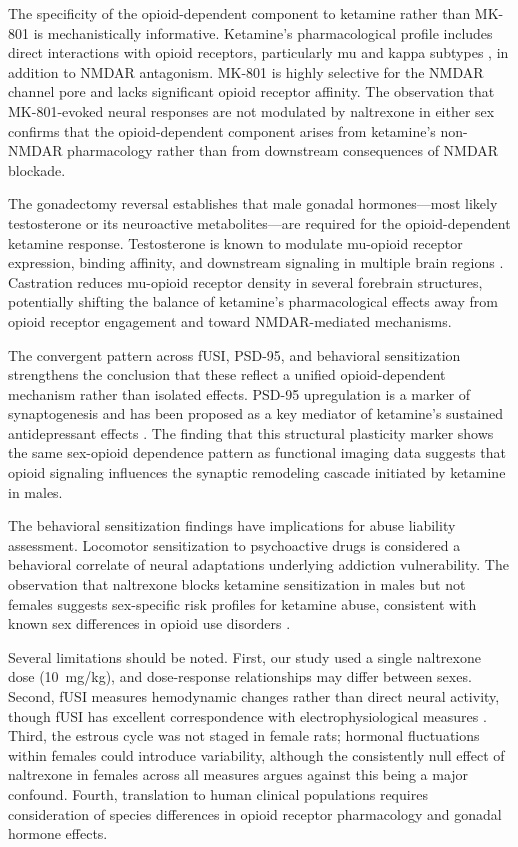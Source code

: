 \documentclass[11pt]{article}
\begin{document}
The specificity of the opioid-dependent component to ketamine rather than MK-801 is mechanistically informative. Ketamine's pharmacological profile includes direct interactions with opioid receptors, particularly mu and kappa subtypes \citep{rabiner2020imaging}, in addition to NMDAR antagonism. MK-801 is highly selective for the NMDAR channel pore and lacks significant opioid receptor affinity. The observation that MK-801-evoked neural responses are not modulated by naltrexone in either sex confirms that the opioid-dependent component arises from ketamine's non-NMDAR pharmacology rather than from downstream consequences of NMDAR blockade.

The gonadectomy reversal establishes that male gonadal hormones---most likely testosterone or its neuroactive metabolites---are required for the opioid-dependent ketamine response. Testosterone is known to modulate mu-opioid receptor expression, binding affinity, and downstream signaling in multiple brain regions \citep{testosterone_opioid2017, gonadectomy_effects2019}. Castration reduces mu-opioid receptor density in several forebrain structures, potentially shifting the balance of ketamine's pharmacological effects away from opioid receptor engagement and toward NMDAR-mediated mechanisms.

The convergent pattern across fUSI, PSD-95, and behavioral sensitization strengthens the conclusion that these reflect a unified opioid-dependent mechanism rather than isolated effects. PSD-95 upregulation is a marker of synaptogenesis \citep{psd95_synaptogenesis2012} and has been proposed as a key mediator of ketamine's sustained antidepressant effects \citep{duman2016synaptic}. The finding that this structural plasticity marker shows the same sex-opioid dependence pattern as functional imaging data suggests that opioid signaling influences the synaptic remodeling cascade initiated by ketamine in males.

The behavioral sensitization findings have implications for abuse liability assessment. Locomotor sensitization to psychoactive drugs is considered a behavioral correlate of neural adaptations underlying addiction vulnerability. The observation that naltrexone blocks ketamine sensitization in males but not females suggests sex-specific risk profiles for ketamine abuse, consistent with known sex differences in opioid use disorders \citep{craft2003sex}.

Several limitations should be noted. First, our study used a single naltrexone dose (10~mg/kg), and dose-response relationships may differ between sexes. Second, fUSI measures hemodynamic changes rather than direct neural activity, though fUSI has excellent correspondence with electrophysiological measures \citep{mace2011functional}. Third, the estrous cycle was not staged in female rats; hormonal fluctuations within females could introduce variability, although the consistently null effect of naltrexone in females across all measures argues against this being a major confound. Fourth, translation to human clinical populations requires consideration of species differences in opioid receptor pharmacology and gonadal hormone effects.
\end{document}
